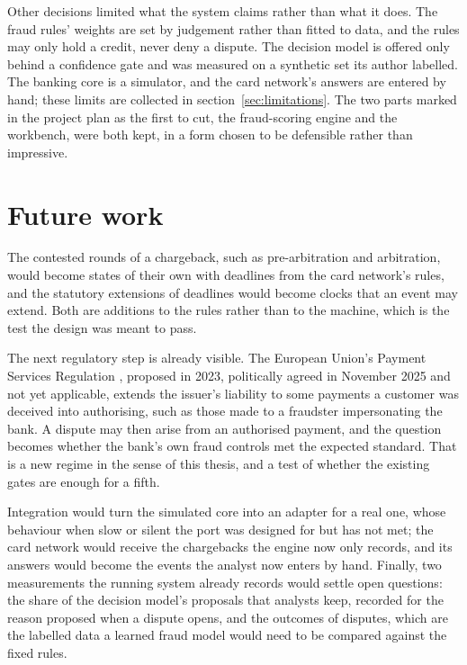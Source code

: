 Other decisions limited what the system claims rather than what it does. The fraud rules' weights are set by judgement
rather than fitted to data, and the rules may only hold a credit, never deny a dispute. The decision model is offered only behind a
confidence gate and was measured on a synthetic set its author labelled. The banking core is a simulator, and the
card network's answers are entered by hand; these limits are collected in section~\ref{sec:limitations}. The two
parts marked in the project plan as the first to cut, the fraud-scoring engine and the workbench, were both kept,
in a form chosen to be defensible rather than impressive.

\section{Future work}
\label{sec:conclusion-future}

The contested rounds of a chargeback, such as pre-arbitration and arbitration, would become states of their own
with deadlines from the card network's rules, and the statutory extensions of deadlines would become clocks that an
event may extend. Both are additions to the rules rather than to the machine, which is the test the design was
meant to pass.

The next regulatory step is already visible. The European Union's Payment Services Regulation \cite{psr}, proposed
in 2023, politically agreed in November 2025 and not yet applicable, extends the issuer's liability to some payments a customer was deceived into authorising, such as those made to a
fraudster impersonating the bank. A dispute may then arise from an authorised payment, and the question becomes
whether the bank's own fraud controls met the expected standard. That is a new regime in the sense of this thesis,
and a test of whether the existing gates are enough for a fifth.

Integration would turn the simulated core into an adapter for a real one, whose behaviour when slow or silent the
port was designed for but has not met; the card network would receive the chargebacks the engine now only records,
and its answers would become the events the analyst now enters by hand. Finally, two measurements the running
system already records would settle open questions: the share of the decision model's proposals that analysts
keep, recorded for the reason proposed when a dispute opens, and the outcomes of disputes, which are the labelled
data a learned fraud model would need to be compared against the fixed rules.
